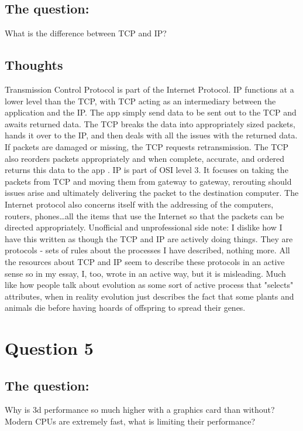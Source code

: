 \documentclass[a4paper]{article}
\begin{document}
\subsection{The question:}
What is the difference between TCP and IP?
\subsection{Thoughts}
	Transmission Control Protocol is part of the Internet Protocol.  IP functions at a lower level than the TCP, with TCP acting as an intermediary between the application and the IP.  The app simply send data to be sent out to the TCP and awaits returned data.  The TCP breaks the data into appropriately sized packets, hands it over to the IP, and then deals with all the issues with the returned data.  If packets are damaged or missing, the TCP requests retransmission.  The TCP also reorders packets appropriately and when complete, accurate, and ordered returns this data to the app \cite{diff}.  IP is part of OSI level 3.  It focuses on taking the packets from TCP and moving them from gateway to gateway, rerouting should issues arise and ultimately delivering the packet to the destination computer.  The Internet protocol also concerns itself with the addressing of the computers, routers, phones\dots all the items that use the Internet so that the packets can be directed appropriately.
    Unofficial and unprofessional side note: I dislike how I have this written as though the TCP and IP are actively doing things.  They are protocols - sets of rules about the processes I have described, nothing more.  All the resources about TCP and IP seem to describe these protocols in an active sense so in my essay, I, too, wrote in an active way, but it is misleading.  Much like how people talk about evolution as some sort of active process that "selects" attributes, when in reality evolution just describes the fact that some plants and animals die before having hoards of offspring to spread their genes.

\section{Question 5}
\label{sec:question 5}
\subsection{The question:}
Why is 3d performance so much higher with a graphics card than without? Modern CPUs are extremely fast, what is limiting their performance?
\end{document}
